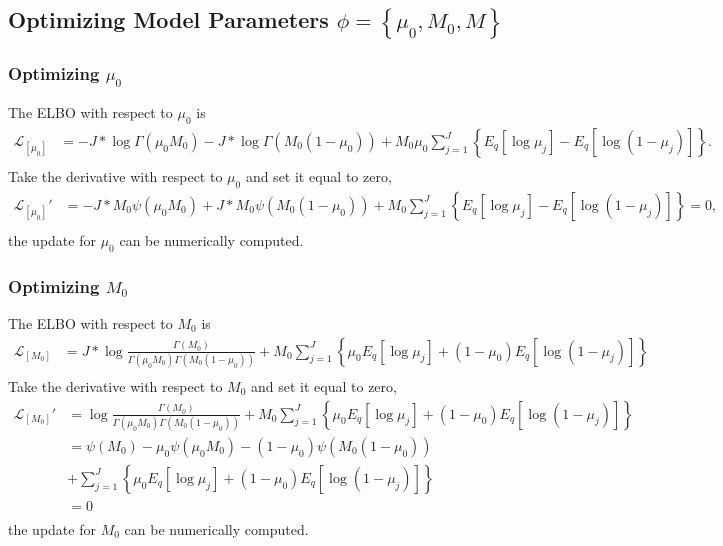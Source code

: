 \documentclass[11pt,reqno]{amsart}
\begin{document}
\subsection{Optimizing Model Parameters $ \phi = \left\lbrace \mu_0, M_0, M \right\rbrace  $}
\subsubsection{Optimizing $ \mu_0 $}
The ELBO with respect to $ \mu_0 $ is
\begin{equation}
\begin{split}
\label{mu_0}
\mathcal{L}_{[\mu_0]}
&= -J*\log  \Gamma(\mu_0 M_0) - J*\log \Gamma(M_0 (1-\mu_0))
+ M_0\mu_0\sum_{j=1}^{J} \left\lbrace E_q  \left[ \log \mu_j \right]
- E_q  \left[ \log (1 - \mu_j)\right]\right\rbrace . \\
\end{split}
\end{equation}
Take the derivative with respect to $ \mu_0 $ and set it equal to zero,
\begin{equation}
\begin{split}
\label{mu_0}
\mathcal{L}_{[\mu_0]}'
&= -J*M_0 \psi(\mu_0 M_0) + J*M_0 \psi(M_0 (1-\mu_0))
+ M_0\sum_{j=1}^{J} \left\lbrace E_q  \left[ \log \mu_j \right]
- E_q  \left[ \log (1 - \mu_j)\right]\right\rbrace =0 , \\
\end{split}
\end{equation}
the update for $ \mu_0 $ can be numerically computed.
\subsubsection{Optimizing $ M_0 $}
The ELBO with respect to $ M_0 $ is
\begin{equation}
\begin{split}
\label{M_0}
\mathcal{L}_{[M_0]}
&=J* \log \frac{ \Gamma(M_0) } { \Gamma(\mu_0 M_0) \Gamma(M_0 (1-\mu_0))}
+ M_0 \sum_{j=1}^{J} \left\lbrace \mu_0E_q  \left[ \log \mu_j \right] + ( 1 - \mu_0) E_q  \left[ \log (1 - \mu_j)\right]\right\rbrace  \\
\end{split}
\end{equation}
Take the derivative with respect to $ M_0 $ and set it equal to zero,
\begin{equation}
\begin{split}
\label{M_0}
\mathcal{L}_{[M_0]}'
&= \log \frac{ \Gamma(M_0) } { \Gamma(\mu_0 M_0) \Gamma(M_0 (1-\mu_0))}
+ M_0 \sum_{j=1}^{J} \left\lbrace \mu_0E_q  \left[ \log \mu_j \right] + ( 1 - \mu_0) E_q  \left[ \log (1 - \mu_j)\right]\right\rbrace  \\
&= \psi(M_0)  - \mu_0 \psi(\mu_0 M_0) - (1-\mu_0) \psi(M_0 (1-\mu_0))  \\
\quad &+ \sum_{j=1}^{J} \left\lbrace \mu_0E_q  \left[ \log \mu_j \right] + ( 1 - \mu_0) E_q  \left[ \log (1 - \mu_j)\right]\right\rbrace \\
&=0 \\
\end{split}
\end{equation}
the update for $ M_0 $ can be numerically computed.
\end{document}
